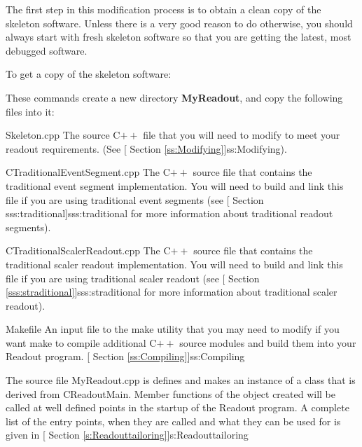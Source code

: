    The first step in this modification process is to obtain a
   clean copy of the skeleton software.   Unless there is a
   very good reason to do otherwise, you should always start
   with fresh skeleton software so that you are getting the
   latest, most debugged software.  

   
   To get a copy of the skeleton software:
   \begin{example}
   \computer{$<>$ }
   \computer{$<>$ }
    
   
   \end{example}

   These commands create a new directory {\bf MyReadout}, and
   copy the following files into it:
   \begin{description}
      \item{Skeleton.cpp} The source C$++$ file that you will
	 need to modify to meet your readout requirements.
	 (See 
	 [
	 Section \ref{ss:Modifying}]{ss:Modifying}).
      \item{CTraditionalEventSegment.cpp}  The C$++$ source file that
	  contains the traditional event segment implementation.  You will need
	  to build and link this file if you are using traditional event
	  segments (see  [
	Section {sss:traditional}]{sss:traditional} for more information
	about traditional readout segments).
      \item {CTraditionalScalerReadout.cpp}  The C$++$ source file that
	  contains the traditional scaler readout implementation.  You
	  will need to build and link this file if you are using traditional
	  scaler readout (see [
	 Section \ref{sss:straditional}]{sss:straditional} for more 
	information about traditional scaler readout).
      \item{Makefile}  An input file to the make utility that
	 you may need to modify if you want make to compile
	 additional C$++$ source modules and build them into
	 your Readout program.
	 [
	    Section \ref{ss:Compiling}]{ss:Compiling}
   \end{description}

   
      The source file {MyReadout.cpp} is defines and
      makes an instance of a class that is derived from 
      CReadoutMain.  Member functions of the object 
      created will be called at well defined points in the
      startup of the Readout program.  A complete list of
      the entry points, when they are called and what they can
      be used for is given in [
      Section \ref{s:Readouttailoring}]{s:Readouttailoring}
      
